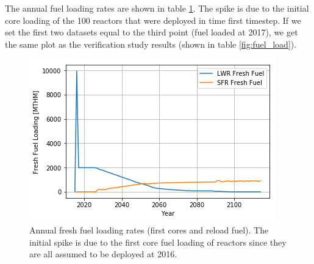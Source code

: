 The annual fuel loading rates are shown in table \ref{fig:fuel_load_unfixed}.
The spike is due to the initial core loading of the 100 reactors that were
deployed in time first timestep. If we set the first two datasets equal to
the third point (fuel loaded at 2017), we get the same plot as the verification
study results (shown in table \ref{fig:fuel_load}).


\begin{figure}[htbp!]
	\begin{center}
		\includegraphics[scale=0.6]{./images/results/fuel_load_unfixed.png}
	\end{center}
        \caption{Annual fresh fuel loading rates (first cores and reload fuel).
        		 The initial spike is due to the first core fuel loading of reactors
        		 since they are all assumed to be deployed at 2016.}
	\label{fig:fuel_load_unfixed}
\end{figure}


